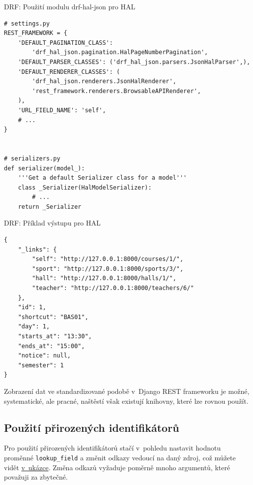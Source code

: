 \begin{listing}[htbp]
\caption{{\label{code:drf:standard}DRF: Použití modulu drf-hal-json pro HAL}}
\begin{verbatim}
# settings.py
REST_FRAMEWORK = {
    'DEFAULT_PAGINATION_CLASS':
        'drf_hal_json.pagination.HalPageNumberPagination',
    'DEFAULT_PARSER_CLASSES': ('drf_hal_json.parsers.JsonHalParser',),
    'DEFAULT_RENDERER_CLASSES': (
        'drf_hal_json.renderers.JsonHalRenderer',
        'rest_framework.renderers.BrowsableAPIRenderer',
    ),
    'URL_FIELD_NAME': 'self',
    # ...
}


# serializers.py
def serializer(model_):
    '''Get a default Serializer class for a model'''
    class _Serializer(HalModelSerializer):
        # ...
    return _Serializer
\end{verbatim}
\end{listing}

\begin{listing}[htbp]
\caption{{\label{code:drf:hal}DRF: Příklad výstupu pro HAL}}
\begin{verbatim}
{
    "_links": {
        "self": "http://127.0.0.1:8000/courses/1/",
        "sport": "http://127.0.0.1:8000/sports/3/",
        "hall": "http://127.0.0.1:8000/halls/1/",
        "teacher": "http://127.0.0.1:8000/teachers/6/"
    },
    "id": 1,
    "shortcut": "BAS01",
    "day": 1,
    "starts_at": "13:30",
    "ends_at": "15:00",
    "notice": null,
    "semester": 1
}
\end{verbatim}
\end{listing}

Zobrazení dat ve standardizované podobě v~Django REST frameworku je možné, systematické, ale pracné, naštěstí však existují knihovny, které lze rovnou použít.

\subsection{Použití přirozených identifikátorů}\label{pouux17eituxed-pux159irozenuxfdch-identifikuxe1torux16f}

Pro použití přirozených identifikátorů stačí v~pohledu nastavit hodnotu proměnné \verb!lookup_field! a změnit odkazy vedoucí na daný zdroj, což můžete vidět \protect\hyperlink{code:drf:ids}{v~ukázce}. Změna odkazů vyžaduje poměrně mnoho argumentů, které považuji za zbytečné.


